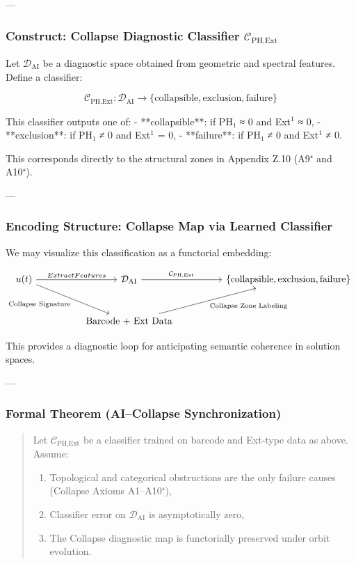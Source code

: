 \documentclass[11pt]{article}
\begin{document}
\begin{axiom}
\begin{axiom}
{{---

\subsubsection*{Construct: Collapse Diagnostic Classifier \(\mathcal{C}_{\text{PH,Ext}}\)}

Let \( \mathcal{D}_{\text{AI}} \) be a diagnostic space obtained from geometric and spectral features.  
Define a classifier:

\[
\mathcal{C}_{\text{PH,Ext}} : \mathcal{D}_{\text{AI}} \to \{ \text{collapsible}, \text{exclusion}, \text{failure} \}
\]

This classifier outputs one of:
- **collapsible**: if PH₁ ≈ 0 and Ext$^1$ ≈ 0,
- **exclusion**: if PH₁ ≠ 0 and Ext$^1$ = 0,
- **failure**: if PH₁ ≠ 0 and Ext$^1$ ≠ 0.

This corresponds directly to the structural zones in Appendix Z.10 (A9⁺ and A10⁺).

---

\subsubsection*{Encoding Structure: Collapse Map via Learned Classifier}

We may visualize this classification as a functorial embedding:

\[
\begin{tikzcd}[row sep=large, column sep=huge]
u(t) \arrow[r, "Extract Features"] \arrow[dr, swap, "\text{Collapse Signature}"] & 
\mathcal{D}_{\text{AI}} \arrow[r, "\mathcal{C}_{\text{PH,Ext}}"] & 
\{ \text{collapsible}, \text{exclusion}, \text{failure} \} \\
& \text{Barcode + Ext Data} \arrow[ur, swap, "\text{Collapse Zone Labeling}"]
\end{tikzcd}
\]

This provides a diagnostic loop for anticipating semantic coherence in solution spaces.

---

\subsubsection*{Formal Theorem (AI–Collapse Synchronization)}

\begin{quote}
Let \( \mathcal{C}_{\text{PH,Ext}} \) be a classifier trained on barcode and Ext-type data  
as above. Assume:

\begin{enumerate}
  \item Topological and categorical obstructions are the only failure causes (Collapse Axioms A1–A10⁺),
  \item Classifier error on \(\mathcal{D}_{\text{AI}}\) is asymptotically zero,
  \item The Collapse diagnostic map is functorially preserved under orbit evolution.
\end{enumerate}


\end{quote}}}
\end{axiom}
\end{axiom}
\end{document}
